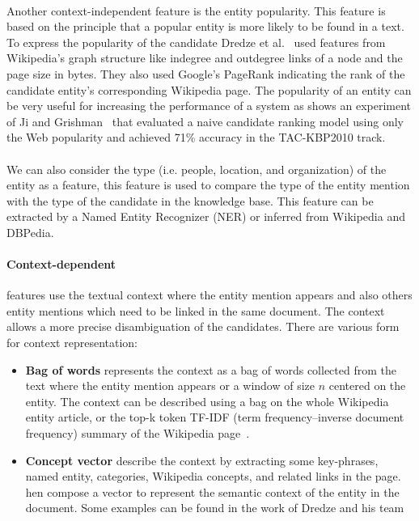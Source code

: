 \paragraph{} Another context-independent feature is the entity popularity. This feature is based on the principle that a popular entity is more likely to be found in a text. To express the popularity of the candidate Dredze et al.~\cite{dredze2010entity} used features from Wikipedia's graph structure like indegree and outdegree links of a node and the page size in bytes. They also used Google's PageRank indicating the rank of the candidate entity's corresponding Wikipedia page. The popularity of an entity can be very useful for increasing the performance of a system as shows an experiment of Ji and Grishman~\cite{ji2011knowledge} that evaluated a naive candidate ranking model using only the Web popularity and achieved 71\% accuracy in the TAC-KBP2010 track.

\paragraph{} We can also consider the type (i.e. people, location, and organization) of the entity as a feature, this feature is used to compare the type of the entity mention with the type of the candidate in the knowledge base. This feature can be extracted by a Named Entity Recognizer (NER) or inferred from Wikipedia and DBPedia.

\paragraph{Context-dependent} features use the textual context where the entity mention appears and also others entity mentions which need to be linked in the same document. The context allows a more precise disambiguation of the candidates. There are various form for context representation:

\begin{itemize}[topsep=10pt]
\item \textbf{Bag of words} represents the context as a bag of words collected from the text where the entity mention appears or a window of size $n$ centered on the entity. The context can be described using a bag on the whole Wikipedia entity article, or the top-k token TF-IDF (term frequency–inverse document frequency) summary of the Wikipedia page~\cite{ratinov2011local}.  

\item \textbf{Concept vector} describe the context by extracting some key-phrases, named entity, categories, Wikipedia concepts, and related links in the page. hen compose a vector to represent the semantic context of the entity in the document. Some examples can be found in the work of Dredze and his team~\cite{dredze2010entity}
\end{itemize}

